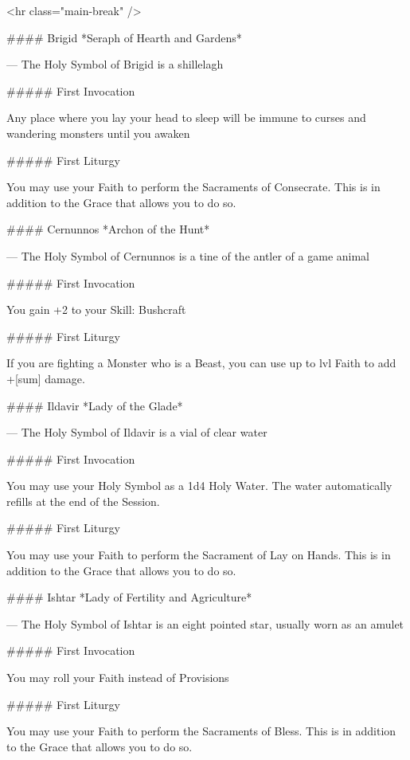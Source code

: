 <hr class="main-break" />



#### Brigid
*Seraph of Hearth and Gardens*

---
The Holy Symbol of Brigid is a shillelagh

##### First Invocation

Any place where you lay your head to sleep will be immune to curses and wandering monsters until you awaken

##### First Liturgy

You may use your Faith to perform the Sacraments of Consecrate. This is in addition to the Grace that allows you to do so.




#### Cernunnos
*Archon of the Hunt*

---
The Holy Symbol of Cernunnos is a tine of the antler of a game animal

##### First Invocation

You gain +2 to your Skill: Bushcraft

##### First Liturgy

If you are fighting a Monster who is a Beast, you can use up to {lvl} Faith to add +[sum] damage.




#### Ildavir
*Lady of the Glade*

---
The Holy Symbol of Ildavir is a vial of clear water

##### First Invocation

You may use your Holy Symbol as a 1d4 Holy Water. The water automatically refills at the end of the Session.

##### First Liturgy

You may use your Faith to perform the Sacrament of Lay on Hands.  This is in addition to the Grace that allows you to do so.




#### Ishtar
*Lady of Fertility and Agriculture*

---
The Holy Symbol of Ishtar is an eight pointed star, usually worn as an amulet

##### First Invocation

You may roll your Faith instead of Provisions

##### First Liturgy

You may use your Faith to perform the Sacraments of Bless.  This is in addition to the Grace that allows you to do so.




